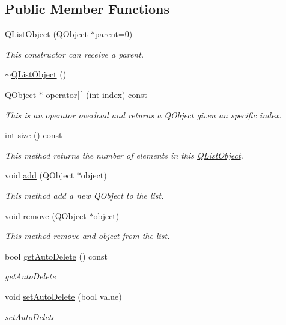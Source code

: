 \subsection*{Public Member Functions}
\begin{DoxyCompactItemize}
\item 
\hyperlink{class_q_list_object_a83076620d8a83ebb0d2b2a4a8bd84e38}{Q\+List\+Object} (Q\+Object $\ast$parent=0)
\begin{DoxyCompactList}\small\item\em This constructor can receive a parent. \end{DoxyCompactList}\item 
\hyperlink{class_q_list_object_a074ae68f366e150abacb1c4baa492bb6}{$\sim$\+Q\+List\+Object} ()
\item 
Q\+Object $\ast$ \hyperlink{class_q_list_object_a6f07490df1b1ba2ed37c7f322e12017b}{operator\mbox{[}$\,$\mbox{]}} (int index) const
\begin{DoxyCompactList}\small\item\em This is an operator overload and returns a Q\+Object given an specific index. \end{DoxyCompactList}\item 
int \hyperlink{class_q_list_object_a4ded55097ea08fa5781240883a591216}{size} () const
\begin{DoxyCompactList}\small\item\em This method returns the number of elements in this \hyperlink{class_q_list_object}{Q\+List\+Object}. \end{DoxyCompactList}\item 
void \hyperlink{class_q_list_object_ad5e960eabd3e9b7d49228ea7549a9bd7}{add} (Q\+Object $\ast$object)
\begin{DoxyCompactList}\small\item\em This method add a new Q\+Object to the list. \end{DoxyCompactList}\item 
void \hyperlink{class_q_list_object_af6bc1883142f976bfd3e82c9d0c030bb}{remove} (Q\+Object $\ast$object)
\begin{DoxyCompactList}\small\item\em This method remove and object from the list. \end{DoxyCompactList}\item 
bool \hyperlink{class_q_list_object_ad9d1f7e3c9f2563bcded31b02edc06fb}{get\+Auto\+Delete} () const
\begin{DoxyCompactList}\small\item\em get\+Auto\+Delete \end{DoxyCompactList}\item 
void \hyperlink{class_q_list_object_a6c30632fb46f8f7d404f77a9fea49bee}{set\+Auto\+Delete} (bool value)
\begin{DoxyCompactList}\small\item\em set\+Auto\+Delete \end{DoxyCompactList}\end{DoxyCompactItemize}


